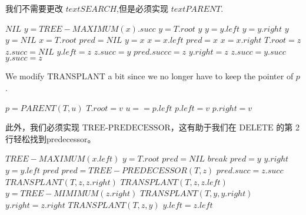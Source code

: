 \documentclass[a4paper, justified]{tufte-handout}
\begin{document}
\begin{solution}
  我们不需要更改 $text{SEARCH}$,但是必须实现 $text{PARENT}$.
  \begin{algorithm}[H]
    \begin{algorithmic}
      \State \Return $NIL$
      \EndIf
      \State $y =  TREE-MAXIMUM(x).succ$
      \State $y = T.root$
      \Else
      \State \Return $y$
      \EndIf
      \State $y=y.left$
      \EndIf
      \State $y = y.right$
      \EndWhile
      \State \Return $y$
      \EndFunction
      \State $y = NIL$
      \State $x = T.root$
      \State $pred = NIL$
      \State $y = x$
      \State $x = x.left$
      \Else
      \State $pred = x$
      \State $x = x.right$
      \EndIf
      \EndWhile
      \State $T.root = z$
      \State $z.succ = NIL$
      \State $y.left = z$
      \State $z.succ = y$
      \State $pred.succc = z$
      \EndIf
      \Else
      \State $y.right = z$
      \State $z.succ = y.succ$
      \State $y.succ = z$
      \EndIf
      \EndProcedure
    \end{algorithmic}
  \end{algorithm}
  We modify $\text{TRANSPLANT}$ a bit since we no longer have to keep the pointer of $p$.
  \begin{algorithm}
    \begin{algorithmic}
      \State $p = PARENT(T,u)$
      \State $T.root = v$
      \ElsIf $u == p.left$
      \State $p.left = v$
      \Else \State $p.right = v$
      \EndIf
      \EndProcedure
    \end{algorithmic}
  \end{algorithm}
  此外，我们必须实现 $\text{TREE-PREDECESSOR}$，这有助于我们在 $\text{DELETE}$ 的第 2 行轻松找到predecessor。
  \begin{algorithm}
    \begin{algorithmic}
      \State \Return $TREE-MAXIMUM(x.left)$
      \EndIf
      \State $y = T.root$
      \State $pred = NIL$
      \State $break$
      \EndIf
      \State $pred = y$
      \State $y.right$
      \Else \State $y = y.left$
      \EndIf
      \EndWhile
      \State \Return $pred$
      \EndFunction
      \State $pred = TREE-PREDECESSOR(T, z)$
      \State $pred.succ = z.succ$
      \State $TRANSPLANT(T, z, z.right)$
      \State $TRANSPLANT(T, z, z.left)$
      \Else
      \State $ y = TREE-MIMIMUM(z.right)$
      \State $TRANSPLANT(T, y, y.right)$
      \State $y.right = z.right$
      \EndIf
      \State $TRANSPLANT(T, z, y)$
      \State $y.left = z.left$
      \EndIf
      \EndProcedure
    \end{algorithmic}
  \end{algorithm}



\end{solution}
\end{document}

